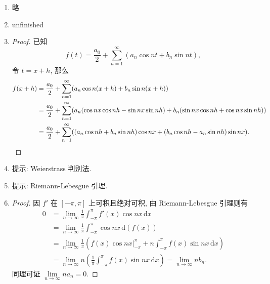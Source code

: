 % 
\begin{enumerate}
    \item %
        略
    \item %
        {\color{red}unfinished}
    \item %
        \begin{proof}
            已知
            \[
                f(t) = \frac{a_0}{2} + \sum_{n=1}^\infty(a_n\cos{nt} + b_n\sin{nt}),    
            \]
            令 $t = x + h$, 那么
            \begin{align*}
                f(x+h) &= \frac{a_0}{2} + \sum_{n=1}^\infty(a_n\cos{n(x+h)} + b_n\sin{n(x+h)}) \\
                &= \frac{a_0}{2} + \sum_{n=1}^\infty(a_n(\cos{nx}\cos{nh} - \sin{nx}\sin{nh}) + b_n(\sin{nx}\cos{nh} + \cos{nx}\sin{nh})) \\
                &= \frac{a_0}{2} + \sum_{n=1}^\infty((a_n\cos{nh}+b_n\sin{nh})\cos{nx} + (b_n\cos{nh} - a_n\sin{nh})\sin{nx}). \qedhere
            \end{align*}
        \end{proof}
    \item %
        提示: Weierstrass 判别法.
    \item %
        提示: Riemann-Lebesgue 引理.
    \item %
        \begin{proof}
            因 $f'$ 在 $[-\pi, \pi]$ 上可积且绝对可积, 由 Riemann-Lebesgue 引理则有
            \begin{align*}
                0 &= \lim_{n\to\infty}\frac{1}{\pi}\int_{-\pi}^{\pi}f'(x)\cos{nx}\,\mathrm{d}x \\
                &= \lim_{n\to\infty}\frac{1}{\pi}\int_{-\pi}^{\pi}\cos{nx}\,\mathrm{d}(f(x)) \\
                &= \lim_{n\to\infty}\frac{1}{\pi}\left(f(x)\cos{nx}|_{-\pi}^{\pi}+n\int_{-\pi}^{\pi}f(x)\sin{nx}\,\mathrm{d}x\right) \\
                &= \lim_{n\to\infty}n\left(\frac{1}{\pi}\int_{-\pi}^{\pi}f(x)\sin{nx}\,\mathrm{d}x\right) = \lim_{n\to\infty}nb_n. 
            \end{align*}
            同理可证 $\lim\limits_{n\to\infty}na_n = 0$.
        \end{proof}
\end{enumerate}
% 
